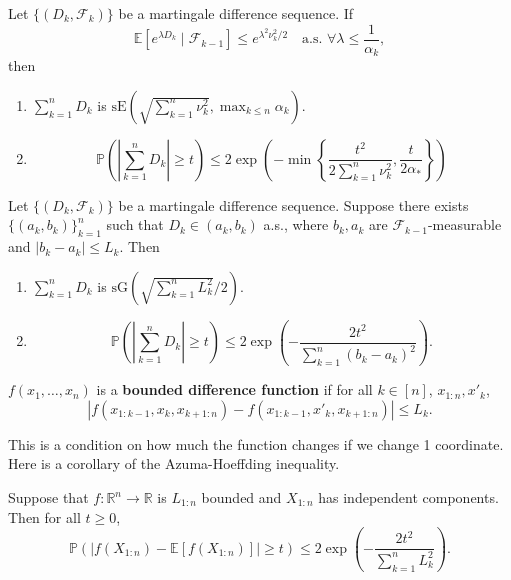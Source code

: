 \begin{thm}
Let $\{(D_k, \mathcal{F}_k)\}$ be a martingale difference sequence. If
\[
\mathbb{E}[e^{\lambda D_k} \mid \mathcal{F}_{k-1}] \leq e^{\lambda^2 \nu_k^2 / 2} \quad \text{a.s. } \forall \lambda \leq \frac{1}{\alpha_k},
\]
then
\begin{enumerate}
    \item $\sum_{k=1}^n D_k$ is $\mathrm{sE}\left(\sqrt{\sum_{k=1}^n \nu_k^2}, \max_{k \leq n} \alpha_k\right)$.
    \item 
    \[
    \mathbb{P}\left( \left| \sum_{k=1}^n D_k \right| \geq t \right) \leq 2 \exp\left( -\min\left\{ \frac{t^2}{2 \sum_{k=1}^n \nu_k^2}, \frac{t}{2\alpha_*} \right\} \right)
    \]
\end{enumerate}
\end{thm}

\begin{cor}
Let $\{(D_k, \mathcal{F}_k)\}$ be a martingale difference sequence. Suppose there exists $\{(a_k, b_k)\}_{k=1}^n$ such that $D_k \in (a_k, b_k)$ a.s., where $b_k, a_k$ are $\mathcal{F}_{k-1}$-measurable and $|b_k - a_k| \leq L_k$. Then
\begin{enumerate}
    \item $\sum_{k=1}^n D_k$ is $\mathrm{sG}\left(\sqrt{\sum_{k=1}^n L_k^2}/2\right)$.
    \item 
    \[
    \mathbb{P}\left( \left| \sum_{k=1}^n D_k \right| \geq t \right) \leq 2 \exp\left( -\frac{2t^2}{\sum_{k=1}^n (b_k - a_k)^2} \right).
    \]
\end{enumerate}
\end{cor}

\begin{defn}
$f(x_1, \ldots, x_n)$ is a \textbf{bounded difference function} if for all $k \in [n]$, $x_{1:n}, x'_k$,
\[
|f(x_{1:k-1}, x_k, x_{k+1:n}) - f(x_{1:k-1}, x'_k, x_{k+1:n})| \leq L_k.
\]
\end{defn}

This is a condition on how much the function changes if we change 1 coordinate. Here is a corollary of the Azuma-Hoeffding inequality.

\begin{cor}
\label{cor:McDiarmid}
Suppose that $f : \mathbb{R}^n \to \mathbb{R}$ is $L_{1:n}$ bounded and $X_{1:n}$ has independent components. Then for all $t \geq 0$,
\[
\mathbb{P}(|f(X_{1:n}) - \mathbb{E}[f(X_{1:n})]| \geq t) \leq 2 \exp\left( -\frac{2t^2}{\sum_{k=1}^n L_k^2} \right).
\]
\end{cor}

